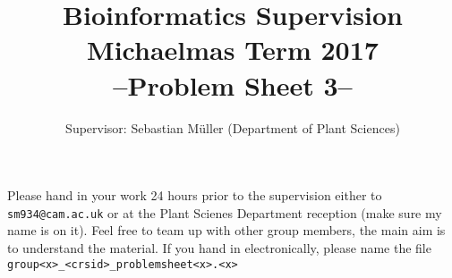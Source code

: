 \documentclass[11pt,runningheads,a4paper]{article}
\begin{document}

\title{{\LARGE Bioinformatics Supervision}\\
{\Large Michaelmas Term 2017}\\
{\Large --Problem Sheet 3--}} 

\author{Supervisor: Sebastian Müller (Department of Plant Sciences)}
\date{}

\maketitle

Please hand in your work 24 hours prior to the supervision either to \texttt{sm934@cam.ac.uk} or at the Plant Scienes Department reception (make sure my name is on it). 
Feel free to team up with other group members, the main aim is to understand the material. 
If you hand in electronically, please name the file \texttt{group<x>\_<crsid>\_problemsheet<x>.<x>}
\end{document}
